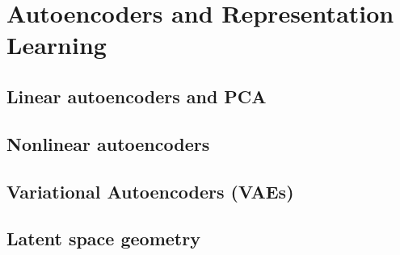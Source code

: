 ﻿\chapter{Autoencoders and Representation Learning}
\section{Linear autoencoders and PCA}

\section{Nonlinear autoencoders}

\section{Variational Autoencoders (VAEs)}

\section{Latent space geometry}


